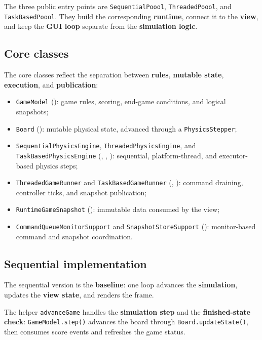 The three public entry points are \texttt{SequentialPoool}, \texttt{ThreadedPoool}, and \texttt{TaskBasedPoool}. They build the corresponding \textbf{runtime}, connect it to the \textbf{view}, and keep the \textbf{GUI loop} separate from the \textbf{simulation logic}.

\subsection{Core classes}

The core classes reflect the separation between \textbf{rules}, \textbf{mutable state}, \textbf{execution}, and \textbf{publication}:

\begin{itemize}
    \item \texttt{GameModel} (): game rules, scoring, end-game conditions, and logical snapshots;
    \item \texttt{Board} (): mutable physical state, advanced through a \texttt{PhysicsStepper};
    \item \texttt{SequentialPhysicsEngine}, \texttt{ThreadedPhysicsEngine}, and \texttt{TaskBasedPhysicsEngine} (, , ): sequential, platform-thread, and executor-based physics steps;
    \item \texttt{ThreadedGameRunner} and \texttt{TaskBasedGameRunner} (, ): command draining, controller ticks, and snapshot publication;
    \item \texttt{RuntimeGameSnapshot} (): immutable data consumed by the view;
    \item \texttt{CommandQueueMonitorSupport} and \texttt{SnapshotStoreSupport} (): monitor-based command and snapshot coordination.
\end{itemize}

\subsection{Sequential implementation}

The sequential version is the \textbf{baseline}: one loop advances the \textbf{simulation}, updates the \textbf{view state}, and renders the frame.

The helper \texttt{advanceGame} handles the \textbf{simulation step} and the \textbf{finished-state check}: \texttt{GameModel.step()} advances the board through \texttt{Board.updateState()}, then consumes score events and refreshes the game status.

